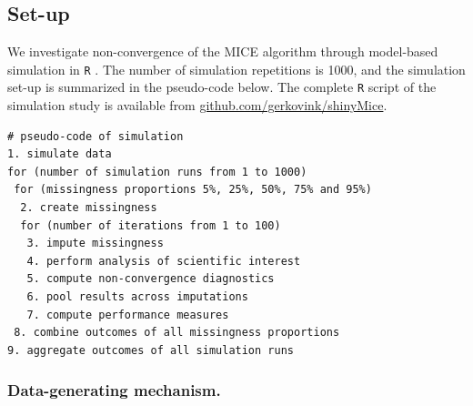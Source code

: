 \documentclass[Royal,times,sageh]{sagej}
\begin{document}
\hypertarget{set-up}{%
\subsection{Set-up}\label{set-up}}

We investigate non-convergence of the MICE algorithm through model-based simulation in \texttt{R} \citep[version 3.6.3;][]{R}. The number of simulation repetitions is 1000, and the simulation set-up is summarized in the pseudo-code below. The complete \texttt{R} script of the simulation study is available from \href{https://github.com/gerkovink/shinyMice/tree/master/3.Thesis/}{github.com/gerkovink/shinyMice}.

\begin{verbatim}
# pseudo-code of simulation 
1. simulate data 
for (number of simulation runs from 1 to 1000)
 for (missingness proportions 5%, 25%, 50%, 75% and 95%)
  2. create missingness
  for (number of iterations from 1 to 100)
   3. impute missingness
   4. perform analysis of scientific interest
   5. compute non-convergence diagnostics 
   6. pool results across imputations
   7. compute performance measures
 8. combine outcomes of all missingness proportions
9. aggregate outcomes of all simulation runs 
\end{verbatim}

\hypertarget{data-generating-mechanism.}{%
\subsubsection{Data-generating mechanism.}\label{data-generating-mechanism.}}
\end{document}
